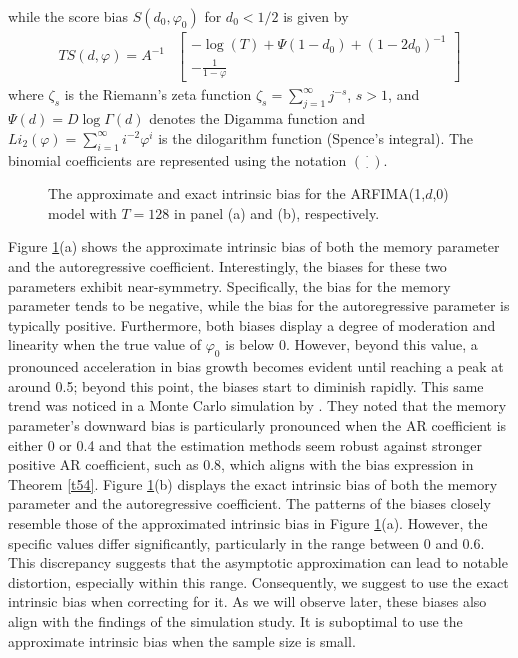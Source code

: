 {{\begin{theorem}
\begin{align*}
\end{align*}
while the score bias $ S(d_0,\varphi_0)$ for $d_0 < 1/2$ is given by
\begin{align}
     T S(d,\varphi)  = A^{-1} 
     &\begin{bmatrix} -\log(T)+\Psi(1-d_0) + (1-2d_0)^{-1}
  \\
-\frac{1}{1-\varphi}
\end{bmatrix} \label{SstatARFI}
\end{align}
where $\zeta_{s}$ is the Riemann's zeta function $\zeta_{s} = \sum_{j = 1}^{\infty} j^{-s}$, $s>1$, and $\Psi(d) = D\log \Gamma(d)$ denotes the Digamma function and $Li_{2}(\varphi) = \sum_{i = 1}^{\infty} i^{-2}\varphi^{i}$ is the dilogarithm function (Spence's integral). The binomial coefficients are represented using the notation $\binom{\cdot}{\cdot}$.
\end{theorem} 





\begin{figure}[H]
  \centering
  \caption{ The approximate and exact intrinsic bias for the ARFIMA(1,$d$,0) model with $T = 128$ in panel (a) and (b), respectively.}  \label{figib}\end{figure}

Figure \ref{figib}(a) shows the approximate intrinsic bias of both the memory parameter and the autoregressive coefficient. Interestingly, the biases for these two parameters exhibit near-symmetry. Specifically, the bias for the
memory parameter tends to be negative, while the bias for the autoregressive parameter is typically positive. Furthermore, both biases display a degree of moderation and linearity when the true value of $\varphi_0$ is below
0. However, beyond this value, a pronounced acceleration in bias growth becomes evident until reaching a peak at around 0.5; beyond this point, the biases start to diminish rapidly. This same trend was noticed in a Monte Carlo
simulation by \textcite{nielsen2005finite}. They noted that the memory parameter's downward bias is particularly pronounced when the AR coefficient is either 0 or 0.4 and that the estimation methods seem robust against stronger
positive AR coefficient, such as 0.8, which aligns with the bias expression in Theorem \ref{t54}.  Figure \ref{figib}(b) displays the exact intrinsic bias of both the memory parameter and the autoregressive coefficient. The
patterns of the biases closely resemble those of the approximated intrinsic bias in Figure \ref{figib}(a). However, the specific values differ significantly, particularly in the range between 0 and 0.6. This discrepancy suggests
that the asymptotic approximation can lead to notable distortion, especially within this range. Consequently, we suggest to use the exact intrinsic bias when correcting for it.  As we will observe later, these biases also align
with the findings of the simulation study. It is suboptimal to use the approximate intrinsic bias when the sample size is small.


}}
